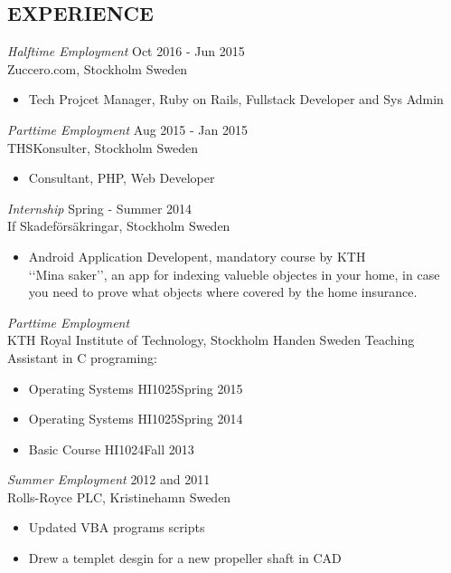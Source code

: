\documentclass[margin]{res}
\begin{document}
\begin{resume}
 
\section{EXPERIENCE}
{\sl Halftime Employment } \hfill  Oct 2016 - Jun 2015 \\
                Zuccero.com, Stockholm Sweden
                 \begin{itemize}  \itemsep -2pt %
                 \item  Tech Projcet Manager, Ruby on Rails, Fullstack Developer and Sys Admin\hfill 
                \end{itemize}
{\sl Parttime Employment } \hfill  Aug 2015 - Jan 2015 \\
                THSKonsulter, Stockholm Sweden
                 \begin{itemize}  \itemsep -2pt %
                 \item  Consultant, PHP, Web Developer\hfill 
                \end{itemize}
    {\sl Internship } \hfill Spring - Summer 2014 \\
                If Skadeförsäkringar, Stockholm Sweden
                 \begin{itemize}  \itemsep -2pt %
                 \item Android Application Developent, mandatory course by KTH \\ ‘‘Mina saker’’, an app for indexing valueble objectes in your home, in case you need to prove what objects where covered by the home insurance.
                \end{itemize}

   {\sl Parttime Employment }  \\
               KTH Royal Institute of Technology, Stockholm Handen Sweden
               Teaching Assistant in C programing:
                 \begin{itemize}  \itemsep -2pt %
                 \item   Operating Systems HI1025\hfill Spring 2015
                 \item  Operating Systems HI1025\hfill Spring 2014
                 \item  Basic Course HI1024\hfill Fall 2013
                \end{itemize}

                
     {\sl Summer Employment } \hfill 2012 and 2011 \\
                 Rolls-Royce PLC, Kristinehamn Sweden
                 \begin{itemize}  \itemsep -2pt %
                 \item Updated VBA programs scripts
                \item  Drew a templet desgin for a new propeller shaft in CAD
               


\end{itemize}
\end{resume}
\end{document}
